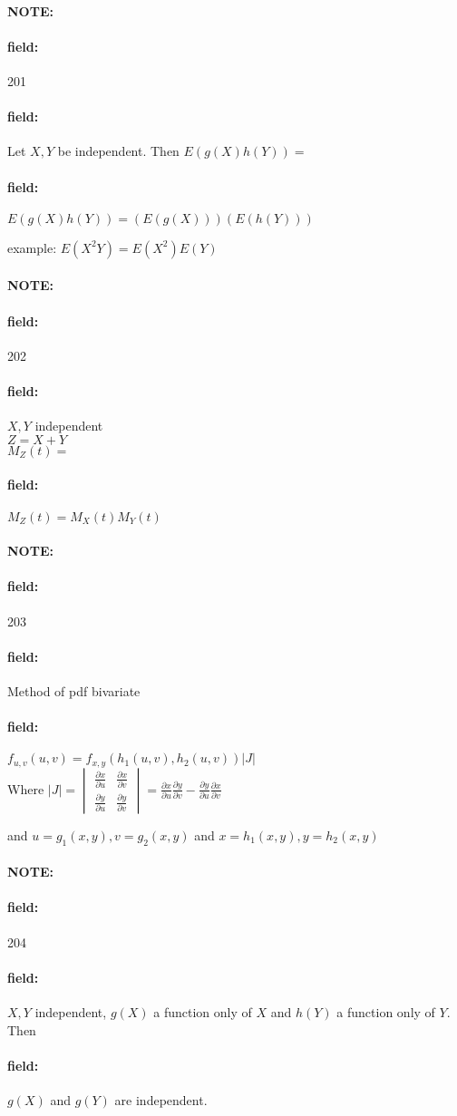 \documentclass[12pt]{article}
\newenvironment{note}{\paragraph{NOTE:}}{}
\newenvironment{field}{\paragraph{field:}}{}
\begin{document}
\begin{note} \begin{field} \tiny 201 \end{field}
  \begin{field}
    Let $X,Y$ be independent. Then $E(g(X)h(Y)) = $
  \end{field}
  \begin{field}
    $E(g(X)h(Y)) = (E(g(X)))(E(h(Y)))$

    example: $E(X^2Y) = E(X^2)E(Y)$
  \end{field}
\end{note}

\begin{note} \begin{field} \tiny 202 \end{field}
  \begin{field}
    $X,Y$ independent\\ $Z = X + Y$  \\ $M_Z(t) = $
  \end{field}
  \begin{field}
    $M_Z(t) = M_X(t)M_Y(t)$
  \end{field}
\end{note}

\begin{note} \begin{field} \tiny 203 \end{field}
  \begin{field}
    Method of pdf bivariate
  \end{field}
  \begin{field}
    $f_{u,v}(u,v) = f_{x,y}(h_1(u,v),h_2(u,v))|J|$\\
    Where $|J| = \begin{vmatrix}
      \frac{\partial  x}{\partial  u} & \frac{\partial  x }{\partial v }\\ \frac{\partial  y }{\partial u } & \frac{\partial  y }{\partial v }
    \end{vmatrix} = \frac{\partial  x }{\partial u } \frac{\partial  y}{\partial v } - \frac{\partial  y }{\partial u } \frac{\partial  x }{\partial v }$

    and $u = g_1(x,y), v = g_2(x,y)$ and $x = h_1(x,y), y = h_2(x,y)$
  \end{field}
\end{note}


\begin{note} \begin{field} \tiny 204 \end{field}
  \begin{field}
    $X,Y$ independent, $g(X)$ a function only of $X$ and $h(Y)$ a function only of $Y$. Then
  \end{field}
  \begin{field}
    $g(X)$ and $g(Y)$ are independent.
  \end{field}
\end{note}
\end{document}
